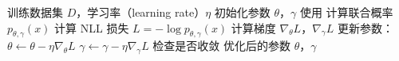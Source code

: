 \begin{algorithm}[H]
\caption{Born 机器的训练过程}
\label{alg:train}
\begin{algorithmic}
\REQUIRE 训练数据集 $D$，学习率（learning rate）$\eta$
\STATE 初始化参数 $\theta$，$\gamma$
        \STATE 使用  计算联合概率 $p_{\theta,\gamma}(x)$
        \STATE 计算 NLL 损失 $L = -\log p_{\theta,\gamma}(x)$
        \STATE 计算梯度 $\nabla_{\theta} L$，$\nabla_{\gamma} L$
        \STATE 更新参数：
        \STATE $\theta \leftarrow \theta - \eta \nabla_{\theta} L$
        \STATE $\gamma \leftarrow \gamma - \eta \nabla_{\gamma} L$
    \ENDFOR
    \STATE 检查是否收敛
\ENDWHILE
\ENSURE 优化后的参数 $\theta$，$\gamma$
\end{algorithmic}
\end{algorithm}

